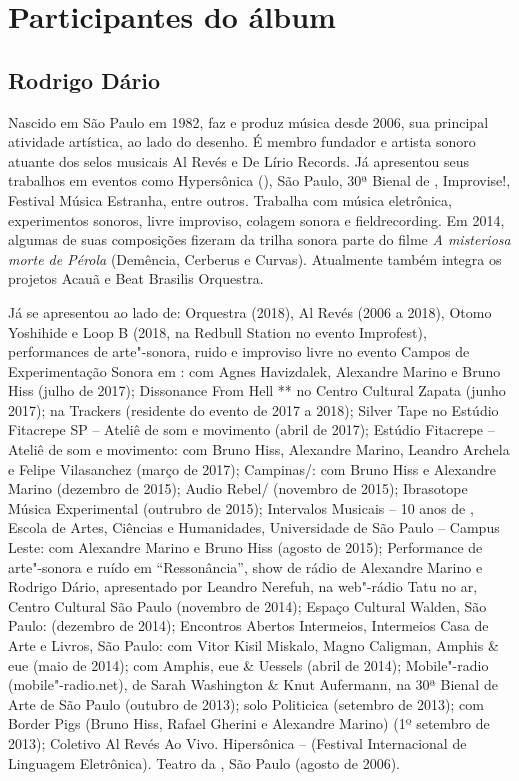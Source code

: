 \chapter{Participantes do álbum}

\section{Rodrigo Dário}

Nascido em São Paulo em 1982, faz e produz música
desde 2006, sua principal atividade artística, ao lado do
desenho. É membro fundador e artista sonoro atuante dos
selos musicais Al Revés e De Lírio Records. Já apresentou
seus trabalhos em eventos como Hypersônica (), 
São Paulo, 30ª Bienal de , Improvise!, Festival Música
Estranha, entre outros. Trabalha com música eletrônica,
experimentos sonoros, livre improviso, colagem sonora
e fieldrecording. Em 2014, algumas de suas composições
fizeram da trilha sonora parte do filme \emph{A misteriosa morte
de Pérola} (Demência, Cerberus e Curvas). Atualmente
também integra os projetos Acauã e Beat Brasilis Orquestra.

Já se apresentou ao lado de:  Orquestra (2018), Al Revés
(2006 a 2018), Otomo Yoshihide e Loop B (2018, na Redbull
Station no evento Improfest), performances de arte"-sonora,
ruido e improviso livre no evento Campos de Experimentação
Sonora em : com Agnes Havizdalek, Alexandre Marino
e Bruno Hiss (julho de 2017); Dissonance From Hell ** no Centro Cultural Zapata (junho 2017); 
na Trackers (residente do evento de 2017 a 2018); Silver Tape
no Estúdio Fitacrepe SP -- Ateliê de som e movimento (abril
de 2017); Estúdio Fitacrepe  -- Ateliê de som e movimento:
com Bruno Hiss, Alexandre Marino, Leandro Archela e Felipe
Vilasanchez (março de 2017);  Campinas/:
com Bruno Hiss e Alexandre Marino (dezembro de 2015);
Audio Rebel/ (novembro de 2015); Ibrasotope Música
Experimental (outrubro de 2015); Intervalos Musicais -- 10
anos de , Escola de Artes, Ciências e Humanidades,
Universidade de São Paulo -- Campus Leste: com Alexandre
Marino e Bruno Hiss (agosto de 2015); Performance de arte"-sonora
e ruído em ``Ressonância'', show de rádio de Alexandre
Marino e Rodrigo Dário, apresentado por Leandro Nerefuh, na
web"-rádio Tatu no ar, Centro Cultural São Paulo (novembro
de 2014); Espaço Cultural Walden, São Paulo: (dezembro
de 2014); Encontros Abertos Intermeios, Intermeios Casa de
Arte e Livros, São Paulo: com Vitor Kisil Miskalo, Magno
Caligman, Amphis \& eue (maio de 2014); com Amphis, eue
\& Uessels (abril de 2014); Mobile"-radio (mobile"-radio.net),
de Sarah Washington \& Knut Aufermann, na 30ª Bienal de
Arte de São Paulo (outubro de 2013); solo Politicica (setembro
de 2013); com Border Pigs (Bruno Hiss, Rafael Gherini e
Alexandre Marino) (1º setembro de 2013); Coletivo Al Revés
Ao Vivo. Hipersônica --  (Festival Internacional de
Linguagem Eletrônica). Teatro da , São Paulo (agosto de
2006). \enlargethispage{\textheight}

